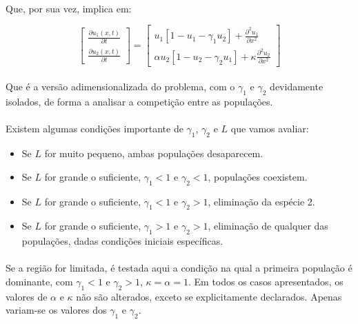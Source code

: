 \documentclass{article}
\begin{document}
	\paragraph{}
	Que, por sua vez, implica em:
	
	$$\left[ \begin{array}{c}
		\frac{\partial u_1(x,t)}{\partial t} \\
		\frac{\partial u_2(x,t)}{\partial t} \end{array} \right]
	=
	\left[ \begin{array}{cc}
		u_1 \left[1 - u_1  - \gamma_1 u_2 \right] +  \frac{\partial^2 u_1}{\partial x^2} \\
		\alpha u_2 \left[1 - u_2  - \gamma_2 u_1 \right] + \kappa \frac{\partial^2 u_2}{\partial x^2} \end{array} \right]$$
	
	\paragraph{}
	Que é a versão adimensionalizada do problema, com o $\gamma_1$ e $\gamma_2$ devidamente isolados, de forma a analisar a competição entre as populações.
	
	\paragraph{}
	Existem algumas condições importante de $\gamma_1$, $\gamma_2$ e $L$ que vamos avaliar:
	
	\begin{itemize}
		\item Se $L$ for muito pequeno, ambas populações desaparecem.
		\item Se $L$ for grande o suficiente, $\gamma_1 < 1$ e $\gamma_2 < 1$, populações coexistem.
		\item Se  $L$ for grande o suficiente, $\gamma_1 < 1$ e $\gamma_2 > 1$, eliminação da espécie 2.
		\item Se   $L$ for grande o suficiente, $\gamma_1 > 1$ e $\gamma_2 > 1$, eliminação de qualquer das populações, dadas condições iniciais específicas.	
	\end{itemize}

	\paragraph{}
	Se a região for limitada, é testada aqui a condição na qual a primeira população é dominante, com $\gamma_1 < 1$ e $\gamma_2 > 1$, $\kappa = \alpha = 1$. Em todos os casos apresentados, os valores de $\alpha$ e $\kappa$ não são alterados, exceto se explicitamente declarados. Apenas variam-se os valores dos $\gamma_1$ e $\gamma_2$.
	
\end{document}

